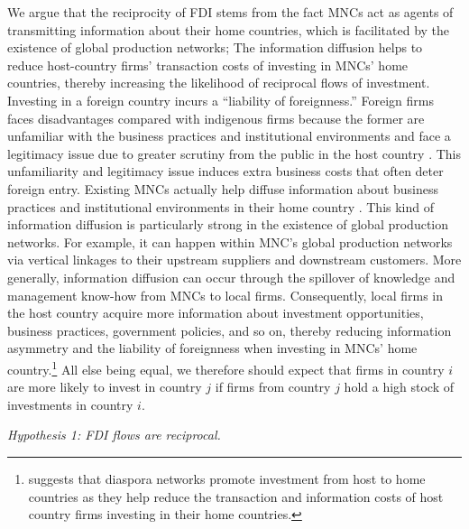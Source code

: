 \documentclass[reqno,onecolumn,letterpaper,12pt]{article}
\begin{document}
We argue that the reciprocity of FDI stems from the fact %
MNCs act as agents of transmitting information about their home countries, which is facilitated by the existence of global production networks; The information diffusion helps to reduce host-country firms' transaction costs of investing in MNCs' home countries, thereby increasing the likelihood of reciprocal flows of investment. Investing in a foreign country incurs a ``liability of foreignness.'' Foreign firms faces disadvantages compared with indigenous firms because the former are unfamiliar with the business practices and institutional environments and face a legitimacy issue due to greater scrutiny from the public in the host country \citep{Zaheer:1995,Kostova_Zaheer:1999,Hymer:1976}. This unfamiliarity and legitimacy issue induces extra business costs that often deter foreign entry. Existing MNCs actually help diffuse information about business practices and institutional environments in their home country \citep{Kwok_Tadesse:2006,Simmons_Elkins:2004}. This kind of information diffusion is particularly strong in the existence of global production networks. For example, it can happen within MNC's global production networks via vertical linkages to their upstream suppliers and downstream customers. More generally, information diffusion can occur through the spillover of knowledge and management know-how from MNCs to local firms. Consequently, local firms in the host country acquire more information about investment opportunities, business practices, government policies, and so on, thereby reducing information asymmetry and the liability of foreignness when investing in MNCs' home country.\footnote{\citet{Leblang:2010} suggests that diaspora networks promote investment from host to home countries as they help reduce the transaction and information costs of host country firms investing in their home countries.} All else being equal, we therefore should expect that firms in country $i$ are more likely to invest in country $j$ if firms from country $j$ hold a high stock of investments in country $i$.


\begin{center}
\textit{Hypothesis 1: FDI flows are reciprocal.}
\end{center}
\end{document}
